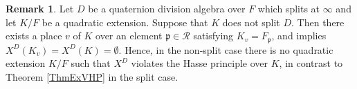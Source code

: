 \documentclass[10pt]{amsart}
\theoremstyle{plain}
\theoremstyle{definition}
\newtheorem{rmk}[thm]{Remark}
\newtheorem{exmp}[thm]{Example}
\newcommand{\Ram}{\mathrm{Ram}}
\newcommand{\cR}{\mathcal{R}}
\newcommand{\vep}{\varepsilon}
\newcommand{\bF}{\mathbb{F}}
\newcommand{\frl}{\mathfrak{l}}
\newcommand{\frn}{\mathfrak{n}}
\newcommand{\frp}{\mathfrak{p}}
\newcommand{\frq}{\mathfrak{q}}
\begin{document}
\begin{rmk}\label{RmkNonSplitCase}
	Let $D$ be a quaternion division algebra over $F$ which splits at $\infty$ and let $K/F$ be a quadratic extension. Suppose that $K$ does not split $D$. 
	Then there exists a place $v$ of $K$ over an element $\frp\in\cR$ satisfying $K_v=F_\frp$, and \cite[Theorem 4.1 (3)]{Pap_loc} implies 
	$X^D(K_v)=X^D(K)=\emptyset$. Hence, in the non-split case there is no 
	quadratic extension $K/F$
	such that $X^D$ violates the Hasse principle over $K$, in contrast to 
	Theorem \ref{ThmExVHP} in the split case.
\end{rmk}

\end{document}
